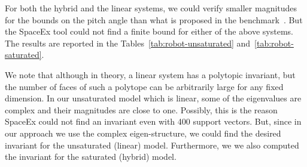   For both the hybrid and the linear systems, we could
verify smaller magnitudes for the bounds on the pitch angle than what
is proposed in the benchmark~\cite{heinz2014benchmark}.  But the
SpaceEx tool could not find a finite bound for either of the above
systems.  The results are reported in the
Tables~\ref{tab:robot-unsaturated} and~\ref{tab:robot-saturated}.

  We note that although in theory, a linear system has a
polytopic invariant, but the number of faces of such a polytope can be
arbitrarily large for any fixed dimension.  In our unsaturated model
which is linear, some of the eigenvalues are complex and their
magnitudes are close to one.  Possibly, this is the reason SpaceEx
could not find an invariant even with 400 support vectors.  But, since
in our approach we use the complex eigen-structure, we could find the
desired invariant for the unsaturated (linear) model.  Furthermore, we
we also computed the invariant for the saturated (hybrid) model.
